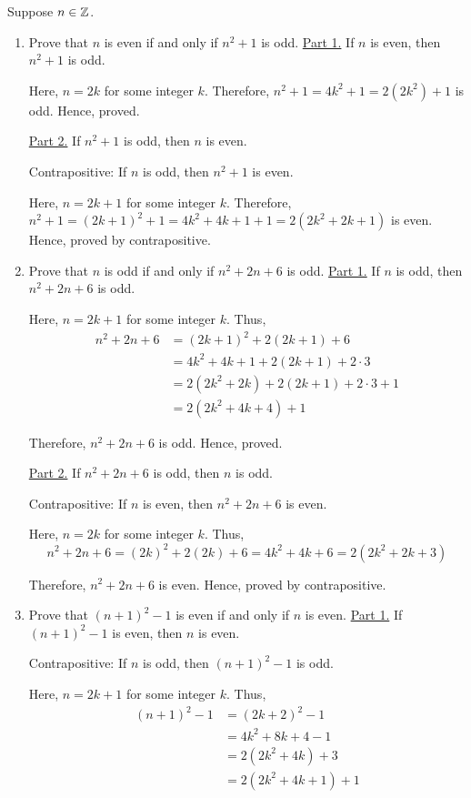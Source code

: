 \bp Suppose $n \in \mathbb{Z}$.
\begin{enumerate}
	\item Prove that $n$ is even if and only if $n^2+1$ is odd.
		\bs
		\underline{Part 1.} If $n$ is even, then $n^2 + 1$ is odd.

		Here, $n = 2k$ for some integer $k$.
		Therefore, $n^2 + 1 = 4k^2 + 1 = 2(2k^2) + 1$ is odd.
		Hence, proved.

		\underline{Part 2.} If $n^2 + 1$ is odd, then $n$ is even.

		Contrapositive: If $n$ is odd, then $n^2 + 1$ is even.

		Here, $n = 2k+1$ for some integer $k$. 
		Therefore, $n^2 + 1 = (2k+1)^2 + 1 = 4k^2 + 4k + 1 + 1 = 2(2k^2 + 2k + 1)$ is even.
		Hence, proved by contrapositive.
		\es

	\item Prove that $n$ is odd if and only if $n^2 + 2n + 6$ is odd.
		\bs
		\underline{Part 1.} If $n$ is odd, then $n^2 + 2n + 6$ is odd.

		Here, $n = 2k+1$ for some integer $k$. Thus,
		\begin{align*}
			n^2 + 2n + 6 &= (2k+1)^2 + 2(2k+1) + 6 \\
									 &= 4k^2 + 4k + 1 + 2(2k+1) + 2 \cdot 3 \\
									 &= 2(2k^2 + 2k) + 2(2k+1) + 2 \cdot 3 + 1 \\ 
									 &= 2(2k^2 + 4k + 4) + 1
		\end{align*}


		Therefore, $n^2 + 2n + 6$ is odd. Hence, proved.

		\underline{Part 2.} If $n^2 + 2n + 6$ is odd, then $n$ is odd.

		Contrapositive: If $n$ is even, then $n^2 + 2n + 6$ is even.

		Here, $n = 2k$ for some integer $k$. Thus,
		$$n^2 + 2n + 6 = (2k)^2 + 2(2k) + 6 = 4k^2 + 4k + 6 = 2(2k^2 + 2k + 3)$$

		Therefore, $n^2 + 2n + 6$ is even. Hence, proved by contrapositive.
		\es

	\item Prove that $(n+1)^2 - 1$ is even if and only if $n$ is even.
		\bs
		\underline{Part 1.} If $(n+1)^2 - 1$ is even, then $n$ is even.

		Contrapositive: If $n$ is odd, then $(n+1)^2 - 1$ is odd.

		Here, $n = 2k+1$ for some integer $k$. Thus,
		\begin{align*}
			(n+1)^2 - 1 &= (2k+2)^2 - 1 \\
									&= 4k^2 + 8k + 4 - 1 \\ 
									&= 2(2k^2 + 4k) + 3 \\
									&= 2(2k^2 + 4k + 1) + 1
		\end{align*}


\end{enumerate}
